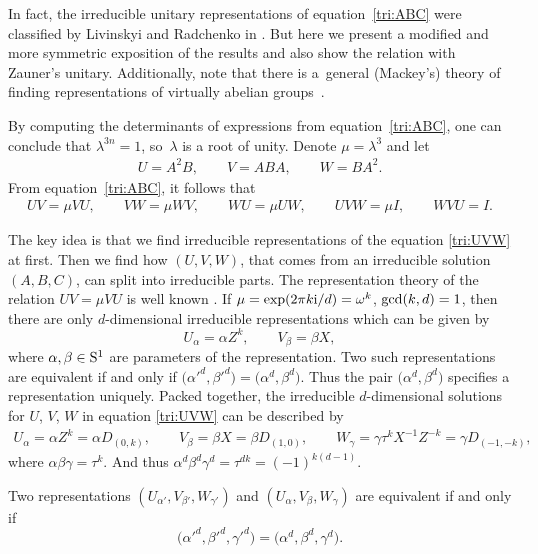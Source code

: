 \documentclass[pdftex]{sigma}
\numberwithin{equation}{section}
\newcommand{\ea}[1]{\begin{align}#1\end{align}}
\begin{document}
In fact, the irreducible unitary representations of equation~\eqref{tri:ABC} were
classified by Livinskyi and Radchenko in \cite{RL}. But here we present a modified and more
symmetric exposition of the results and also show the relation with Zauner's unitary.
Additionally, note that there is a~general (Mackey's) theory of finding representations
of virtually abelian groups~\cite{Kyr}.

By computing the determinants of expressions from equation~\eqref{tri:ABC}, one can conclude that $\lambda^{3n} = 1$,
so~$\lambda$ is a root of unity.
Denote $\mu = \lambda^3$ and let
\begin{align*}
U = A^2B,
\qquad
V = ABA,
\qquad
W = BA^2.
\end{align*}
From equation~\eqref{tri:ABC}, it follows that
\ea{ \label{tri:UVW}
UV = \mu VU,
\qquad
VW = \mu WV,
\qquad
WU = \mu UW,
\qquad
UVW = \mu I,
\qquad
WVU = I.
}

The key idea is that we find irreducible representations of the equation \eqref{tri:UVW}
at first.
Then we find how $(U,V,W)$, that comes from an irreducible solution $(A,B,C)$,
can split into irreducible parts.
The representation theory of the relation $UV=\mu VU$ is well known \cite{Davidson,Weyl}.
If $\mu = \exp (2\pi k{\rm i}/d)  = \omega^k$, ${\rm gcd}(k,d)=1$,
then there are only $d$-dimensional irreducible representations which can be given by
\[
U_\alpha = \alpha Z^k,
\qquad
V_\beta = \beta X,
\]
where $\alpha, \beta \in {\rm S}^1$ are parameters of the representation.
Two such representations are equivalent if and only if
$\bigl(\alpha'^d, \beta'^d\bigr) = \bigl(\alpha^d, \beta^d\bigr)$. Thus the pair $\bigl(\alpha^d, \beta^d\bigr)$
specifies a representation uniquely.
Packed together, the irreducible $d$-dimensional solutions for $U$, $V$, $W$ in equation \eqref{tri:UVW}
can be described by
\begin{gather}
  U_\alpha = \alpha Z^k = \alpha D_{(0,k)},\qquad V_\beta = \beta X = \beta D_{(1,0)}, \qquad
 W_\gamma = \gamma \tau^k X^{-1}Z^{-k} = \gamma D_{(-1,-k)},\label{tri:UVWsol}
\end{gather}
where $\alpha \beta \gamma = \tau^k$.
And thus $\alpha^d \beta^d \gamma^d = \tau^{dk} = (-1)^{k(d-1)}$.

Two representations $(U_{\alpha'}, V_{\beta'}, W_{\gamma'})$ and $(U_\alpha, V_\beta, W_\gamma)$
are equivalent if and only if
\[
\bigl(\alpha'^d, \beta'^d, \gamma'^d\bigr) =\allowbreak \bigl(\alpha^d, \beta^d, \gamma^d\bigr).
\]
\end{document}
